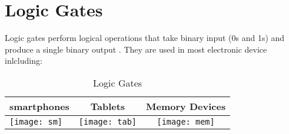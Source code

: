 \documentclass{article}
\begin{document}
	
	\section{Logic Gates}
	Logic gates perform logical operations that take binary input (0s and 1s) and produce a single binary output . They are used in most electronic device inlcluding:
	
	\begin{table}[h!]
		\begin{center}
			\caption{Logic Gates}
			\label{tab:table1}
			\begin{tabular}{|l|c|c|}
				\hline
				smartphones
				&
				Tablets
				&
				Memory Devices
				\\
				\hline
				\texttt{[image: sm]}
				&
				\texttt{[image: tab]}
				&
				\texttt{[image: mem]}
				\\
				\hline
			\end{tabular}
		\end{center}
	\end{table}
\end{document}
